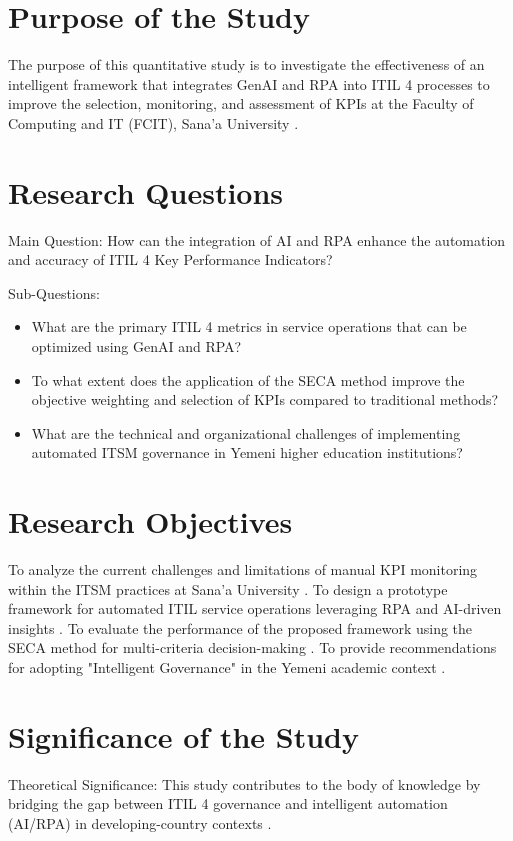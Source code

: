 \documentclass[12pt,a4paper,oneside]{report}
\begin{document}
\section{Purpose of the Study}
The purpose of this quantitative study is to investigate the effectiveness of an intelligent framework that integrates GenAI and RPA into ITIL 4 processes to improve the selection, monitoring, and assessment of KPIs at the Faculty of Computing and IT (FCIT), Sana'a University \cite{almontaser2025}.

\section{Research Questions}
Main Question: How can the integration of AI and RPA enhance the automation and accuracy of ITIL 4 Key Performance Indicators? \cite{almontaser2025}

Sub-Questions: \cite{almontaser2025}
\begin{itemize}
    \item What are the primary ITIL 4 metrics in service operations that can be optimized using GenAI and RPA? \cite{almontaser2025}
    \item To what extent does the application of the SECA method improve the objective weighting and selection of KPIs compared to traditional methods? \cite{almontaser2025}
    \item What are the technical and organizational challenges of implementing automated ITSM governance in Yemeni higher education institutions? \cite{almontaser2025}
\end{itemize}

\section{Research Objectives}     
To analyze the current challenges and limitations of manual KPI monitoring within the ITSM practices at Sana'a University \cite{almontaser2025}.
To design a prototype framework for automated ITIL service operations leveraging RPA and AI-driven insights \cite{almontaser2025}.
To evaluate the performance of the proposed framework using the SECA method for multi-criteria decision-making \cite{almontaser2025}.
To provide recommendations for adopting "Intelligent Governance" in the Yemeni academic context \cite{almontaser2025}.

\section{Significance of the Study}
Theoretical Significance: This study contributes to the body of knowledge by bridging the gap between ITIL 4 governance and intelligent automation (AI/RPA) in developing-country contexts \cite{almontaser2025}.
\end{document}
